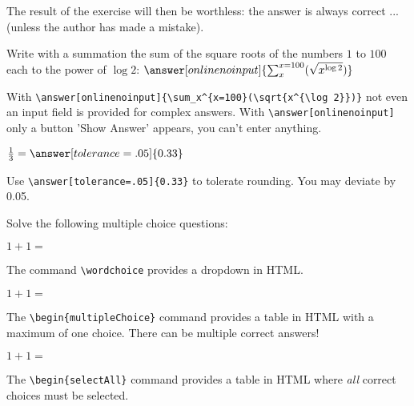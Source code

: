 \documentclass{ximera}
\begin{document}
\begin{exercise}
\begin{question}
       The result of the exercise will then be worthless: the answer is always correct ... (unless the author has made a mistake).
    \end{question}

	\begin{question}

        Write with a summation the sum of the square roots of the numbers $1$ to $100$ each to the power of $\log 2$: $\answer[onlinenoinput]{\sum_x^{x=100}(\sqrt{x^{\log 2}})}$

        With \verb|\answer[onlinenoinput]{\sum_x^{x=100}(\sqrt{x^{\log 2}})}| not even an input field is provided for complex answers. 
        With \verb|\answer[onlinenoinput]| only a button 'Show Answer' appears, you can't enter anything.

    \end{question}

    \begin{question}
        $\frac{1}{3} =  \answer[tolerance=.05]{0.33}$  

        Use \verb|\answer[tolerance=.05]{0.33}| to tolerate rounding. You may deviate by 0.05.
    \end{question}
\end{exercise}

\begin{exercise}
       Solve the following multiple choice questions:
    \begin{question}
        $1+1 = $

        The command \verb|\wordchoice| provides a dropdown in HTML.
    \end{question}
    \begin{question}
        $1+1 = $\begin{multipleChoice} \end{multipleChoice}

        The \verb|\begin{multipleChoice}| command provides a table in HTML with a maximum of one choice. There can be multiple correct answers!

    \end{question}
    \begin{question} 
        $1+1 = $\begin{selectAll} \end{selectAll}

        The \verb|\begin{selectAll}| command provides a table in HTML where \textit{all} correct choices must be selected.    
    \end{question}

\end{exercise}
\end{document}
